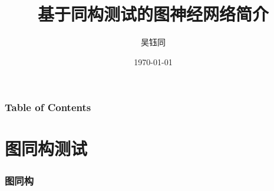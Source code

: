 \documentclass{beamer}
\title %
{基于同构测试的图神经网络简介}
\author %
{吴钰同}
\date %
{\today}
\begin{document}
\frame{\titlepage}


\begin{frame}
\frametitle{Table of Contents}
\tableofcontents
\end{frame}


\section{图同构测试}

\begin{frame}

  \frametitle{图同构}


\end{frame}
\end{document}
